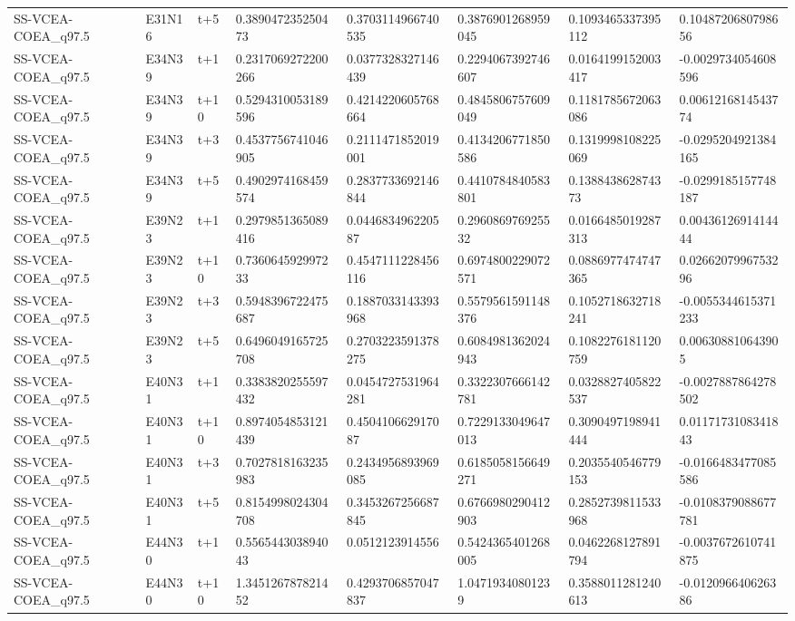 \begin{landscape}
\begin{longtable}{llllllll}
SS-VCEA-COEA\_q97.5 & E31N16 & t+5 & 0.389047235250473 & 0.3703114966740535 & 0.3876901268959045 & 0.1093465337395112 & 0.1048720680798656 \\
SS-VCEA-COEA\_q97.5 & E34N39 & t+1 & 0.2317069272200266 & 0.0377328327146439 & 0.2294067392746607 & 0.0164199152003417 & -0.0029734054608596 \\
SS-VCEA-COEA\_q97.5 & E34N39 & t+10 & 0.5294310053189596 & 0.4214220605768664 & 0.4845806757609049 & 0.1181785672063086 & 0.0061216814543774 \\
SS-VCEA-COEA\_q97.5 & E34N39 & t+3 & 0.4537756741046905 & 0.2111471852019001 & 0.4134206771850586 & 0.1319998108225069 & -0.0295204921384165 \\
SS-VCEA-COEA\_q97.5 & E34N39 & t+5 & 0.4902974168459574 & 0.2837733692146844 & 0.4410784840583801 & 0.138843862874373 & -0.0299185157748187 \\
SS-VCEA-COEA\_q97.5 & E39N23 & t+1 & 0.2979851365089416 & 0.044683496220587 & 0.296086976925532 & 0.0166485019287313 & 0.0043612691414444 \\
SS-VCEA-COEA\_q97.5 & E39N23 & t+10 & 0.736064592997233 & 0.4547111228456116 & 0.6974800229072571 & 0.0886977474747365 & 0.0266207996753296 \\
SS-VCEA-COEA\_q97.5 & E39N23 & t+3 & 0.5948396722475687 & 0.1887033143393968 & 0.5579561591148376 & 0.1052718632718241 & -0.0055344615371233 \\
SS-VCEA-COEA\_q97.5 & E39N23 & t+5 & 0.6496049165725708 & 0.2703223591378275 & 0.6084981362024943 & 0.1082276181120759 & 0.006308810643905 \\
SS-VCEA-COEA\_q97.5 & E40N31 & t+1 & 0.3383820255597432 & 0.0454727531964281 & 0.3322307666142781 & 0.0328827405822537 & -0.0027887864278502 \\
SS-VCEA-COEA\_q97.5 & E40N31 & t+10 & 0.8974054853121439 & 0.450410662917087 & 0.7229133049647013 & 0.3090497198941444 & 0.0117173108341843 \\
SS-VCEA-COEA\_q97.5 & E40N31 & t+3 & 0.7027818163235983 & 0.2434956893969085 & 0.6185058156649271 & 0.2035540546779153 & -0.0166483477085586 \\
SS-VCEA-COEA\_q97.5 & E40N31 & t+5 & 0.8154998024304708 & 0.3453267256687845 & 0.6766980290412903 & 0.2852739811533968 & -0.0108379088677781 \\
SS-VCEA-COEA\_q97.5 & E44N30 & t+1 & 0.556544303894043 & 0.0512123914556 & 0.5424365401268005 & 0.0462268127891794 & -0.0037672610741875 \\
SS-VCEA-COEA\_q97.5 & E44N30 & t+10 & 1.345126787821452 & 0.4293706857047837 & 1.04719340801239 & 0.3588011281240613 & -0.012096640626386 \\

\end{longtable}
\end{landscape}
